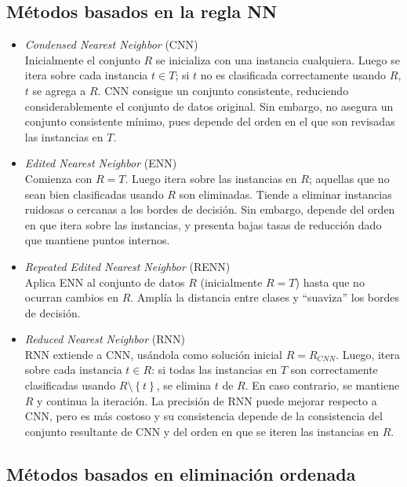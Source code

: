 \subsection{Métodos basados en la regla NN}

\begin{itemize}
\item \emph{Condensed Nearest Neighbor} (CNN) \cite{Hart:2006:CNN:2263267.2267647}\\
Inicialmente el conjunto $R$ se inicializa con una instancia cualquiera. Luego se itera sobre cada instancia $t \in T$; si $t$ no es clasificada correctamente usando $R$, $t$ se agrega a $R$.
CNN consigue un conjunto consistente, reduciendo considerablemente el conjunto de datos original. Sin embargo, no asegura un conjunto consistente mínimo, pues depende del orden en el que son revisadas las instancias en $T$.
\item \emph{Edited Nearest Neighbor} (ENN) \cite{wilson1972asymptotic}\\
Comienza con $R = T$. Luego itera sobre las instancias en $R$; aquellas que no sean bien clasificadas usando $R$ son eliminadas. Tiende a eliminar instancias ruidosas o cercanas a los bordes de decisión. Sin embargo, depende del orden en que itera sobre las instancias, y presenta bajas tasas de reducción dado que mantiene puntos internos.
\item \emph{Repeated Edited Nearest Neighbor} (RENN) \cite{wilson1972asymptotic}\\
Aplica ENN al conjunto de datos $R$ (inicialmente $R = T$) hasta que no ocurran cambios en $R$. Amplía la distancia entre clases y ``suaviza'' los bordes de decisión.
\item \emph{Reduced Nearest Neighbor} (RNN) \cite{DBLP:journals/tit/Gates72}\\
RNN extiende a CNN, usándola como solución inicial $R = R_{CNN}$. Luego, itera sobre cada instancia $t \in R$: si todas las instancias en $T$ son correctamente clasificadas usando $R\setminus\left\lbrace t \right\rbrace$, se elimina $t$ de $R$. En caso contrario, se mantiene $R$ y continua la iteración. La precisión de RNN puede mejorar respecto a CNN, pero es más costoso y su consistencia depende de la consistencia del conjunto resultante de CNN y del orden en que se iteren las instancias en $R$.
\end{itemize}

\subsection{Métodos basados en eliminación ordenada}

